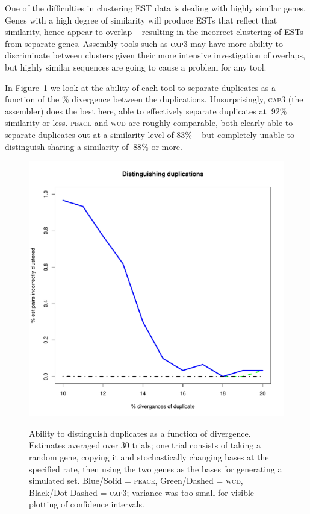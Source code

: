 \documentclass[a4paper,12pt]{article}
\begin{document}
\begin{appendix}
One of the difficulties in clustering EST data is dealing with
highly similar genes.  Genes with a high degree of similarity will
produce ESTs that reflect that similarity, hence appear to overlap --
resulting in the incorrect clustering of ESTs from separate genes.  Assembly tools
such as \textsc{cap3} may have more ability to discriminate between clusters
given their more intensive investigation of overlaps, but highly
similar sequences are going to cause a problem for any tool. 

In Figure~\ref{dups} we look at the ability of each tool to separate
duplicates as a function of the \% divergence between the
duplications.  Unsurprisingly, \textsc{cap3} (the assembler) does the best
here, able to effectively separate duplicates at $~92\%$ similarity
or less.  \textsc{peace} and \textsc{wcd} are roughly comparable, both clearly able to
separate duplicates out at a similarity level of $83\%$ -- but completely 
unable to distinguish sharing a similarity of $~88\%$ or more. 

\begin{figure}[tbp]
\centerline{
\label{dups}
\includegraphics[scale=0.35]{pics.d/duplicates_40.pdf}
}
\caption{Ability to distinguish duplicates as a function of
  divergence.  Estimates averaged over 30 trials; one trial consists
  of taking a random gene, copying it and stochastically changing bases
  at the specified rate, then using the two genes as the bases for
  generating a simulated set. Blue/Solid = \textsc{peace}, Green/Dashed = \textsc{wcd}, Black/Dot-Dashed = \textsc{cap3};
  variance was too small for visible plotting of
  confidence intervals.}
\end{figure}


\end{appendix}
\end{document}
